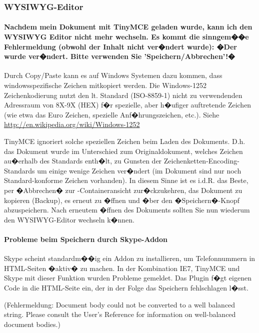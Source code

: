\subsubsection{ WYSIWYG-Editor}
\label{faq-tinymce}

\paragraph{Nachdem mein Dokument mit TinyMCE geladen wurde, kann ich den
WYSIWYG Editor nicht mehr wechseln. Es kommt die sinngem��e
Fehlermeldung (obwohl der Inhalt nicht ver�ndert wurde): �Der  wurde
ver�ndert. Bitte verwenden Sie 'Speichern/Abbrechen'!�}

Durch Copy/Paste kann es auf Windows Systemen dazu kommen, dass windowsspezifische
Zeichen mitkopiert werden. Die Windows-1252 Zeichenkodierung nutzt
den lt. Standard (ISO-8859-1) nicht zu verwendenden Adressraum von 8X-9X (HEX)
f�r spezielle, aber h�ufiger auftretende Zeichen (wie etwa das Euro Zeichen,
spezielle Anf�hrungszeichen, etc.). Siehe \url{http://en.wikipedia.org/wiki/Windows-1252}

TinyMCE ignoriert solche speziellen Zeichen beim Laden des Dokuments. D.h. das
Dokument wurde im Unterschied zum Originaldokument, welches Zeichen au�erhalb
des Standards enth�lt, zu Gunsten der Zeichenketten-Encoding-Standards um
einige wenige Zeichen ver�ndert (im Dokument sind nur noch Standard-konforme Zeichen vorhanden). In diesem Sinne ist es i.d.R. das Beste, per �Abbrechen� zur
-Containeransicht zur�ckzukehren, das Dokument zu kopieren (Backup), es
erneut zu �ffnen und �ber den �Speichern�-Knopf abzuspeichern. Nach erneutem
�ffnen des Dokuments sollten Sie nun wiederum den WYSIWYG-Editor wechseln k�nnen.

\paragraph{Probleme beim Speichern durch Skype-Addon}

Skype scheint standardm��ig ein Addon zu installieren, um Telefonnummern in
HTML-Seiten �aktiv� zu machen. In der Kombination IE7, TinyMCE und Skype mit
dieser Funktion wurden Probleme gemeldet. Das Plugin f�gt eigenen Code in die
HTML-Seite ein, der in der Folge das Speichern fehlschlagen l�sst.

(Fehlermeldung: Document body could not be converted to a well balanced string.
Please consult the User's Reference for information on well-balanced document
bodies.)

